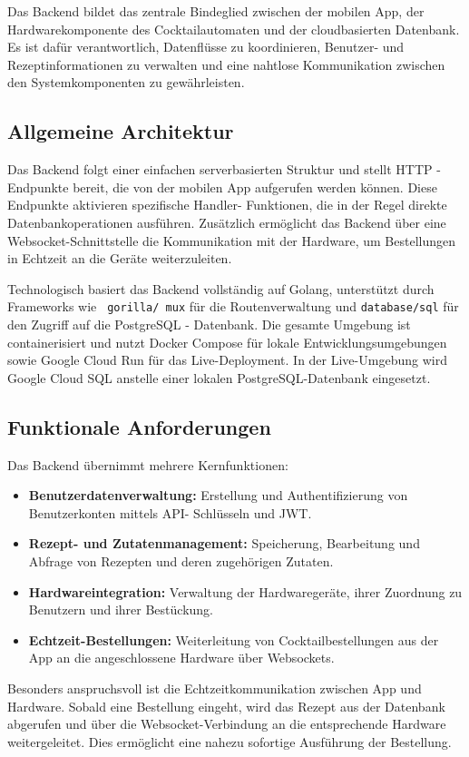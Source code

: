 Das Backend bildet das zentrale Bindeglied zwischen der mobilen App, der Hardwarekomponente des 
Cocktailautomaten und der cloudbasierten Datenbank. Es ist dafür verantwortlich, Datenflüsse zu 
koordinieren, Benutzer- und Rezeptinformationen zu verwalten und eine nahtlose Kommunikation 
zwischen den Systemkomponenten zu gewährleisten.

\subsection{Allgemeine Architektur}

Das Backend folgt einer einfachen serverbasierten Struktur und stellt HTTP - Endpunkte bereit, die 
von der mobilen App aufgerufen werden können. Diese Endpunkte aktivieren spezifische Handler-
Funktionen, die in der Regel direkte Datenbankoperationen ausführen. Zusätzlich ermöglicht das 
Backend über eine Websocket-Schnittstelle die Kommunikation mit der Hardware, um Bestellungen in 
Echtzeit an die Geräte weiterzuleiten.

Technologisch basiert das Backend vollständig auf Golang, unterstützt durch Frameworks wie \texttt{
gorilla/ mux} für die Routenverwaltung und \texttt{database/sql} für den Zugriff auf die PostgreSQL 
- Datenbank. Die gesamte Umgebung ist containerisiert und nutzt Docker Compose für lokale 
Entwicklungsumgebungen sowie Google Cloud Run für das Live-Deployment. In der Live-Umgebung wird 
Google Cloud SQL anstelle einer lokalen PostgreSQL-Datenbank eingesetzt.

\subsection{Funktionale 
Anforderungen}

Das Backend übernimmt mehrere Kernfunktionen:

\begin{itemize}
	\item \textbf{Benutzerdatenverwaltung:} Erstellung und Authentifizierung von Benutzerkonten 
	mittels API- Schlüsseln und JWT.
	\item \textbf{Rezept- und Zutatenmanagement:} Speicherung, Bearbeitung und Abfrage von Rezepten 
	und deren zugehörigen Zutaten.
	\item \textbf{Hardwareintegration:} Verwaltung der Hardwaregeräte, ihrer Zuordnung zu Benutzern 
	und ihrer Bestückung.
	\item \textbf{Echtzeit-Bestellungen:} Weiterleitung von Cocktailbestellungen aus der App an die 
	angeschlossene Hardware über Websockets.
\end{itemize}
Besonders anspruchsvoll ist die Echtzeitkommunikation zwischen App und Hardware. Sobald eine 
Bestellung eingeht, wird das Rezept aus der Datenbank abgerufen und über die Websocket-Verbindung 
an die entsprechende Hardware weitergeleitet. Dies ermöglicht eine nahezu sofortige Ausführung der 
Bestellung.

